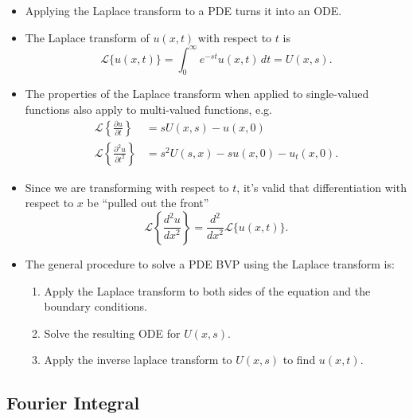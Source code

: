 \documentclass{article}
\begin{document}
\begin{itemize}
  \item Applying the Laplace transform to a PDE turns it into an ODE.

  \item The Laplace transform of $u(x, t)$ with respect to $t$ is \[\mathcal{L}\{u(x, t)\} = \int_0^\infty e^{-s t} u(x, t) \,d t = U(x, s).\]

  \item The properties of the Laplace transform when applied to single-valued functions also apply to multi-valued functions, e.g. \begin{align*}
          \mathcal{L} \left\{ \frac{\partial u}{\partial t} \right\}     & = s U(x, s) - u(x, 0)                  \\
          \mathcal{L} \left\{ \frac{\partial^2 u}{\partial t^2} \right\} & = s^2 U(s, x) - s u(x, 0) - u_t(x, 0).
        \end{align*}

  \item Since we are transforming with respect to $t$, it's valid that differentiation with respect to $x$ be ``pulled out the front'' \[\mathcal{L} \left\{ \frac{d^2 u}{d x^2} \right\} = \frac{d^2}{d x^2} \mathcal{L}\{u(x, t)\}.\]

  \item The general procedure to solve a PDE BVP using the Laplace transform is:

        \begin{enumerate}
          \item Apply the Laplace transform to both sides of the equation and the boundary conditions.

          \item Solve the resulting ODE for $U(x, s)$.

          \item Apply the inverse laplace transform to $U(x, s)$ to find $u(x, t)$.
        \end{enumerate}
\end{itemize}

\subsection{Fourier Integral}
\end{document}
